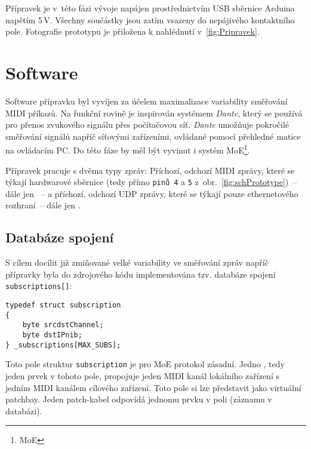 Přípravek je v~této fázi vývoje napájen prostřednictvím \acs{USB} sběrnice Arduina napětím 5\,\unit{V}. Všechny součástky jsou zatím vsazeny do nepájivého kontaktního pole. Fotografie prototypu je přiložena k nahlédnutí v~\ref{fig:Pripravek}.


\section{Software}
Software přípravku byl vyvíjen za účelem maximalizace variability směřování \acs{MIDI} příkazů. Na funkční rovině je inspirován systémem \emph{Dante}, který se používá pro přenos zvukového signálu přes počítačovou síť. \emph{Dante} umožňuje pokročilé směřování signálů napříč síťovými zařízeními, ovládané pomocí přehledné matice na ovládacím PC. Do této fáze by měl být vyvinut i systém \acs{MoE}\footnote{\acl{MoE}}.

Přípravek pracuje s dvěma typy zpráv: Příchozí, odchozí \acs{MIDI} zprávy, které se týkají hardwarové sběrnice (tedy přímo \texttt{pinů~4} a \texttt{5} z~obr.~\ref{fig:schPrototype})~-- dále jen ~-- a příchozí, odchozí UDP zprávy, které se týkají pouze ethernetového rozhraní~-- dále jen .
\subsection{Databáze spojení}\label{chpt:DatSpoj}
S cílem docílit již zmiňované velké variability ve směřování zpráv napříč přípravky byla do zdrojového kódu implementována tzv. databáze spojení \texttt{sub\-scrip\-tions[]}:
\begin{lstlisting}
typedef struct subscription
{
    byte srcdstChannel;
    byte dstIPnib;
} _subscriptions[MAX_SUBS];
\end{lstlisting}
Toto pole struktur \texttt{subscription} je pro \acs{MoE} protokol zásadní. Jedno , tedy jeden prvek v tohoto pole, propojuje jeden \acs{MIDI} kanál lokálního zařízení s jedním \acs{MIDI} kanálem cílového zařízení. Toto pole si lze představit jako virtuální patchbay. Jeden patch-kabel odpovídá jednomu prvku v poli (záznamu v databázi). 

